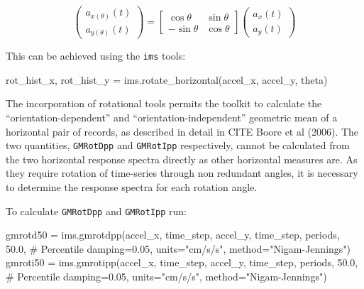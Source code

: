 \begin{equation}
\begin{pmatrix}a_{x \left( {\theta} \right)} \left( t \right) \\ a_{y \left( {\theta} \right)} \left( t \right)\end{pmatrix} = \begin{bmatrix}\cos \theta & \sin \theta \\ -\sin \theta & \cos \theta \end{bmatrix} \begin{pmatrix}a_x\left( t \right) \\ a_y\left( t \right)\end{pmatrix}
\end{equation}

\noindent This can be achieved using the \verb=ims= tools:

\begin{python}[frame=single]
rot_hist_x, rot_hist_y = ims.rotate_horizontal(accel_x,
                                               accel_y,
                                               theta)
\end{python}

The incorporation of rotational tools permits the toolkit to calculate the ``orientation-dependent'' and ``orientation-independent'' geometric mean of a horizontal pair of records, as described in detail in CITE Boore et al (2006). The two quantities, \verb=GMRotDpp= and \verb=GMRotIpp= respectively, cannot be calculated from the two horizontal response spectra directly as other horizontal measures are. As they require rotation of time-series through non redundant angles, it is necessary to determine the response spectra for each rotation angle.

To calculate \verb=GMRotDpp= and \verb=GMRotIpp= run:

\begin{python}
gmrotd50 = ims.gmrotdpp(accel_x, time_step,
                        accel_y, time_step,
                        periods,
                        50.0, # Percentile
                        damping=0.05,
                        units="cm/s/s",
                        method="Nigam-Jennings")
gmroti50 = ims.gmrotipp(accel_x, time_step,
                        accel_y, time_step,
                        periods,
                        50.0, # Percentile
                        damping=0.05,
                        units="cm/s/s",
                        method="Nigam-Jennings")
\end{python}


